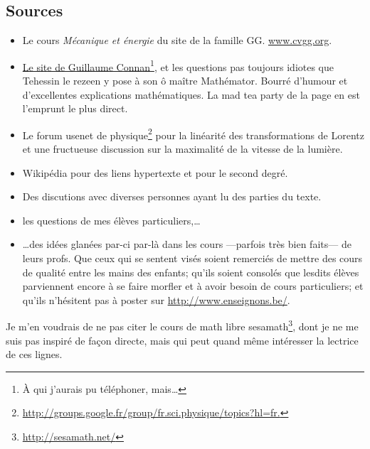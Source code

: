 \subsection{Sources}

\begin{itemize}
	\item
		Le cours \emph{Mécanique et énergie} du \og site de la famille GG\fg. \href{www.cvgg.org}{www.cvgg.org}.
	\item 
		\href{http://gconnan.free.fr/}{Le site de Guillaume Connan}\footnote{À qui j'aurais pu téléphoner, mais\ldots}, et les questions pas toujours idiotes que Tehessin le rezeen y pose à son ô maître Mathémator. Bourré d'humour et d'excellentes explications mathématiques. La mad tea party de la page \pageref{PgMadTeaParty} en est l'emprunt le plus direct.
	\item 
		Le forum usenet de physique\footnote{\href{http://groups.google.fr/group/fr.sci.physique/topics?hl=fr.}{http://groups.google.fr/group/fr.sci.physique/topics?hl=fr.}} pour la linéarité des transformations de Lorentz et une fructueuse discussion sur la maximalité de la vitesse de la lumière. 
	\item 
		Wikipédia pour des liens hypertexte et pour le second degré.
	\item 
		Des discutions avec diverses personnes ayant lu des parties du texte.
	\item 
		les questions de mes élèves particuliers,\ldots
	\item 
		\ldots des idées glanées par-ci par-là dans les cours ---parfois très bien faits--- de leurs profs. Que ceux qui se sentent visés soient remerciés de mettre des cours de qualité entre les mains des enfants; qu'ils soient consolés que lesdits élèves parviennent encore à se faire morfler et à avoir besoin de cours particuliers; et qu'ils n'hésitent pas à poster sur \href{http://www.enseignons.be/}{http://www.enseignons.be/}.
\end{itemize}

Je m'en voudrais de ne pas citer le cours de math libre sesamath\footnote{\href{http://manuel.sesamath.net/}{http://sesamath.net/}}, dont je ne me suis pas inspiré de façon directe, mais qui peut quand même intéresser la lectrice de ces lignes.


